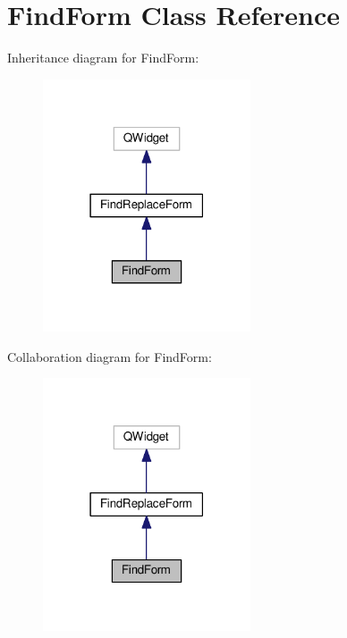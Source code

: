 \hypertarget{classFindForm}{}\section{Find\+Form Class Reference}
\label{classFindForm}


Inheritance diagram for Find\+Form\+:\nopagebreak
\begin{figure}[H]
\begin{center}
\leavevmode
\includegraphics[width=174pt]{classFindForm__inherit__graph}
\end{center}
\end{figure}


Collaboration diagram for Find\+Form\+:\nopagebreak
\begin{figure}[H]
\begin{center}
\leavevmode
\includegraphics[width=174pt]{classFindForm__coll__graph}
\end{center}
\end{figure}
